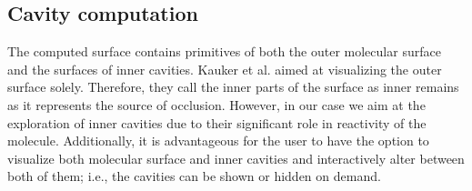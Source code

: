 \subsection{Cavity computation}
\label{sec:graph}
   

The computed surface contains primitives of both the outer molecular surface and the surfaces of inner cavities.
Kauker et al. \cite{kauker2013rendering} aimed at visualizing the outer surface solely.
Therefore, they call the inner parts of the surface as inner remains as it represents the source of occlusion.
However, in our case we aim at the exploration of inner cavities due to their significant role in reactivity of the molecule.
Additionally, it is advantageous for the user to have the option to visualize both molecular surface and inner cavities and interactively alter between both of them; i.e., the cavities can be shown or hidden on demand.

